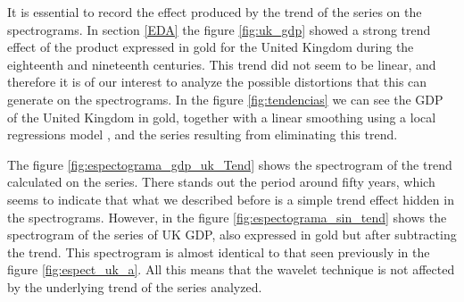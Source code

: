 \documentclass[a4paper,10cpi]{article}
\begin{document}
	It is essential to record the effect produced by the trend of the series on the spectrograms. In section \ref{EDA} the figure \ref{fig:uk_gdp} showed a strong trend effect of the product expressed in gold for the United Kingdom during the eighteenth and nineteenth centuries. This trend did not seem to be linear, and therefore it is of our interest to analyze the possible distortions that this can generate on the spectrograms. In the figure \ref{fig:tendencias} we can see the GDP of the United Kingdom in gold, together with a linear smoothing using a local regressions model \citep{Shyu1992}, and the series resulting from eliminating this trend.
	
	The figure \ref{fig:espectograma_gdp_uk_Tend} shows the spectrogram of the trend calculated on the series. There stands out the period around fifty years, which seems to indicate that what we described before is a simple trend effect hidden in the spectrograms. However, in the figure \ref{fig:espectograma_sin_tend} shows the spectrogram of the series of UK GDP, also expressed in gold but after subtracting the trend. This spectrogram is almost identical to that seen previously in the figure \ref{fig:espect_uk_a}. All this means that the wavelet technique is not affected by the underlying trend of the series analyzed.
	
\end{document}
